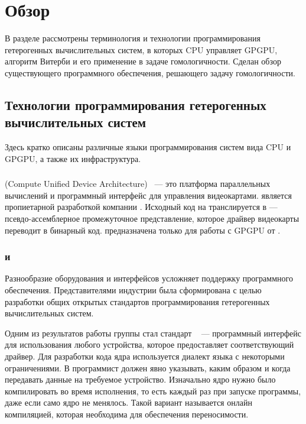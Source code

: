 \section{Обзор}
В разделе рассмотрены терминология и технологии программирования гетерогенных
вычислительных систем, в которых CPU управляет GPGPU, алгоритм Витерби и его
применение в задаче гомологичности.
Сделан обзор существующего программного обеспечения, решающего задачу
гомологичности.

\subsection[Технологии программирования гетерогенных систем] {Технологии
программирования гетерогенных\\вычислительных систем}
Здесь кратко описаны различные языки программирования систем вида 
CPU и GPGPU, а также их инфраструктура.

\subsubsection{}
 (Compute Unified Device Architecture)~\cite{CUDA} --- 
это платформа параллельных вычислений и программный интерфейс 
для управления видеокартами.
 является пропиетарной разработкой компании .
Исходный код на  транслируется в  ---
псевдо-ассемблерное промежуточное представление, 
которое драйвер видеокарты переводит в бинарный код.
 предназначена только для работы с GPGPU от .

\subsubsection{ и }
Разнообразие оборудования и интерфейсов усложняет поддержку
программного обеспечения.
Представителями индустрии была сформирована  с целью
разработки общих открытых стандартов программирования гетерогенных
вычислительных систем.

Одним из результатов работы группы стал стандарт 
~\cite{OpenCL} --- программный интерфейс для использования любого
устройства, которое предоставляет соответствующий драйвер.
Для разработки кода ядра используется диалект
языка  с некоторыми ограничениями.
В  программист должен явно указывать, каким образом и когда
передавать данные на требуемое устройство.
Изначально ядро нужно было компилировать во время исполнения, 
то есть каждый раз при запуске программы, даже если само ядро не менялось.
Такой вариант называется онлайн компиляцией, которая необходима для 
обеспечения переносимости.

